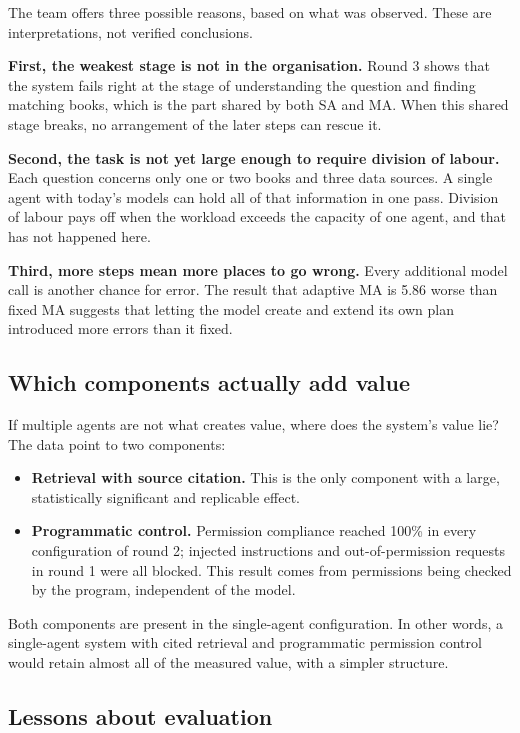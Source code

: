 The team offers three possible reasons, based on what was observed. These are interpretations, not verified conclusions.

\textbf{First, the weakest stage is not in the organisation.} Round 3 shows that the system fails right at the stage of understanding the question and finding matching books, which is the part shared by both SA and MA. When this shared stage breaks, no arrangement of the later steps can rescue it.

\textbf{Second, the task is not yet large enough to require division of labour.} Each question concerns only one or two books and three data sources. A single agent with today's models can hold all of that information in one pass. Division of labour pays off when the workload exceeds the capacity of one agent, and that has not happened here.

\textbf{Third, more steps mean more places to go wrong.} Every additional model call is another chance for error. The result that adaptive MA is 5.86 \pp{} worse than fixed MA suggests that letting the model create and extend its own plan introduced more errors than it fixed.

\subsection{Which components actually add value}

If multiple agents are not what creates value, where does the system's value lie? The data point to two components:

\begin{itemize}
    \item \textbf{Retrieval with source citation.} This is the only component with a large, statistically significant and replicable effect.
    \item \textbf{Programmatic control.} Permission compliance reached 100\% in every configuration of round 2; injected instructions and out-of-permission requests in round 1 were all blocked. This result comes from permissions being checked by the program, independent of the model.
\end{itemize}

Both components are present in the single-agent configuration. In other words, a single-agent system with cited retrieval and programmatic permission control would retain almost all of the measured value, with a simpler structure.

\subsection{Lessons about evaluation}

